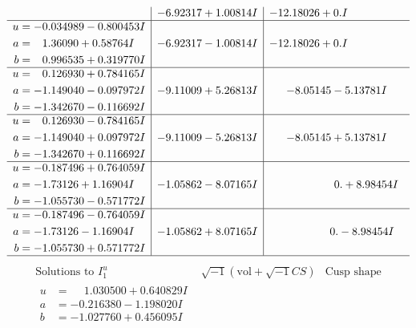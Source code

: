 \documentclass[1p]{elsarticle_modified}
\theoremstyle{definition}
\newcommand{\I}{\sqrt{-1}}
\begin{document}
$$\begin{array}{c|c|c}
 & -6.92317 + 1.00814 I & -12.18026 + 0. I\phantom{ +0.000000I} \\ \hline\begin{aligned}
u &= -0.034989 - 0.800453 I \\
a &= \phantom{-}1.36090 + 0.58764 I \\
b &= \phantom{-}0.996535 + 0.319770 I\end{aligned}
 & -6.92317 - 1.00814 I & -12.18026 + 0. I\phantom{ +0.000000I} \\ \hline\begin{aligned}
u &= \phantom{-}0.126930 + 0.784165 I \\
a &= -1.149040 - 0.097972 I \\
b &= -1.342670 - 0.116692 I\end{aligned}
 & -9.11009 + 5.26813 I & -8.05145 - 5.13781 I \\ \hline\begin{aligned}
u &= \phantom{-}0.126930 - 0.784165 I \\
a &= -1.149040 + 0.097972 I \\
b &= -1.342670 + 0.116692 I\end{aligned}
 & -9.11009 - 5.26813 I & -8.05145 + 5.13781 I \\ \hline\begin{aligned}
u &= -0.187496 + 0.764059 I \\
a &= -1.73126 + 1.16904 I \\
b &= -1.055730 - 0.571772 I\end{aligned}
 & -1.05862 - 8.07165 I & \phantom{-0.000000 -}0. + 8.98454 I \\ \hline\begin{aligned}
u &= -0.187496 - 0.764059 I \\
a &= -1.73126 - 1.16904 I \\
b &= -1.055730 + 0.571772 I\end{aligned}
 & -1.05862 + 8.07165 I & \phantom{-0.000000 } 0. - 8.98454 I\\
 \hline 
 \end{array}$$\newpage$$\begin{array}{c|c|c}  
\text{Solutions to }I^u_{1}& \I (\text{vol} + \sqrt{-1}CS) & \text{Cusp shape}\\
 \hline 
\begin{aligned}
u &= \phantom{-}1.030500 + 0.640829 I \\
a &= -0.216380 - 1.198020 I \\
b &= -1.027760 + 0.456095 I\end{aligned}

\end{array}$$
\end{document}
